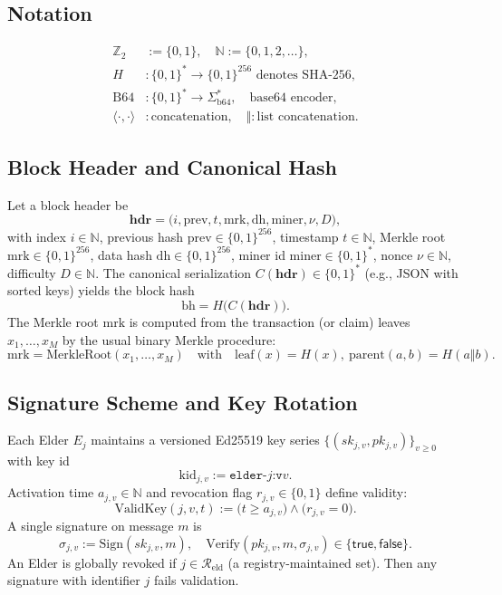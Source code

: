 \documentclass[11pt,a4paper]{article}
\begin{document}
\subsection{Notation}
\begin{align*}
\mathbb{Z}_2 &:= \{0,1\}, \quad \mathbb{N} := \{0,1,2,\dots\}, \\
H &: \{0,1\}^* \to \{0,1\}^{256} \text{ denotes SHA-256}, \\
\mathrm{B64} &: \{0,1\}^* \to \Sigma_{\text{b64}}^*, \quad \text{base64 encoder},\\
\langle \cdot, \cdot \rangle &: \text{concatenation}, \quad \Vert: \text{list concatenation}.
\end{align*}

\subsection{Block Header and Canonical Hash}
Let a block header be
\[
\mathbf{hdr} = \big(i, \mathrm{prev}, t, \mathrm{mrk}, \mathrm{dh}, \mathrm{miner}, \nu, D\big),
\]
with index $i\in\mathbb{N}$, previous hash $\mathrm{prev}\in\{0,1\}^{256}$, timestamp $t\in\mathbb{N}$, Merkle root $\mathrm{mrk}\in\{0,1\}^{256}$, data hash $\mathrm{dh}\in\{0,1\}^{256}$, miner id $\mathrm{miner}\in \{0,1\}^*$, nonce $\nu\in\mathbb{N}$, difficulty $D\in\mathbb{N}$. The canonical serialization $C(\mathbf{hdr})\in \{0,1\}^*$ (e.g., JSON with sorted keys) yields the block hash
\[
\mathrm{bh} = H\!\big(C(\mathbf{hdr})\big).
\]
The Merkle root $\mathrm{mrk}$ is computed from the transaction (or claim) leaves $x_1,\dots,x_M$ by the usual binary Merkle procedure:
\[
\mathrm{mrk} = \mathrm{MerkleRoot}(x_1,\dots,x_M) \quad \text{with} \quad \mathrm{leaf}(x)=H(x),\ \mathrm{parent}(a,b)=H(a\Vert b).
\]

\subsection{Signature Scheme and Key Rotation}
Each Elder $E_j$ maintains a versioned Ed25519 key series $\{(sk_{j,v}, pk_{j,v})\}_{v\ge 0}$ with key id
\[
\mathrm{kid}_{j,v} := \texttt{elder-}j\texttt{:v}v.
\]
Activation time $a_{j,v}\in \mathbb{N}$ and revocation flag $r_{j,v}\in\{0,1\}$ define validity:
\[
\mathrm{ValidKey}(j,v,t) := \big(t \ge a_{j,v}\big)\wedge \big(r_{j,v}=0\big).
\]
A single signature on message $m$ is
\[
\sigma_{j,v} := \mathrm{Sign}(sk_{j,v}, m),\quad \mathrm{Verify}(pk_{j,v}, m, \sigma_{j,v})\in\{\textsf{true},\textsf{false}\}.
\]
An Elder is globally revoked if $j\in \mathcal{R}_{\text{eld}}$ (a registry-maintained set). Then any signature with identifier $j$ fails validation.
\end{document}
